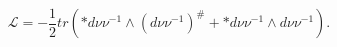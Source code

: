 \begin{equation}
 \mathcal{L=-}\frac{1}{2}tr(\ast d\nu \nu ^{-1}\wedge (d\nu \nu
^{-1})^{\#}+\ast d\nu \nu ^{-1}\wedge d\nu \nu ^{-1}).
\end{equation}

